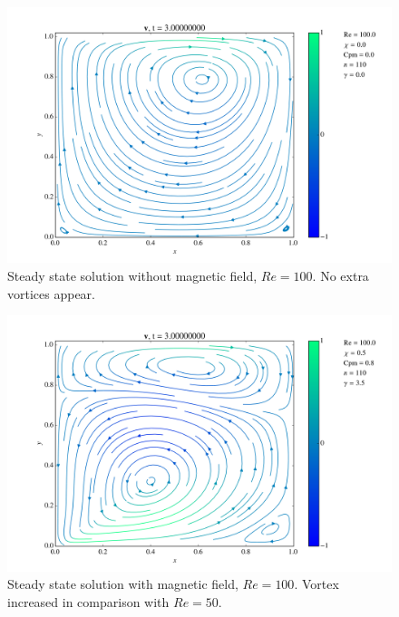 \documentclass[journal]{IEEEtran}
\begin{document}
\begin{figure}[!t]
\centering
\includegraphics[width=\linewidth]{figures/Re100/n/vectorField}
\caption{Steady state solution without magnetic field, $\mathit{Re}=100$. No extra vortices appear. \label{Re100nVectorField}}
\end{figure}

\begin{figure}[!t]
\centering
\includegraphics[width=\linewidth]{figures/Re100/w/vectorField}
\caption{Steady state solution with magnetic field, $\mathit{Re}=100$. Vortex increased in comparison with $\mathit{Re} = 50$. \label{Re100wVectorField}}
\end{figure}
\end{document}

